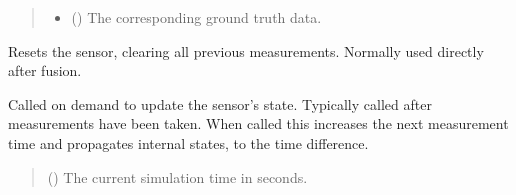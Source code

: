 \documentclass[letterpaper,10pt,english]{sphinxmanual}
\begin{document}
\begin{fulllineitems}
\begin{fulllineitems}
\begin{quote}
\begin{description}
\begin{itemize}
\item {} 
\sphinxAtStartPar
{} ({\hyperref[\detokenize{modules/waypoints/trajectory:qnav.waypoints.trajectory.GroundTruth}]{}}) \textendash{} The corresponding ground truth data.

\end{itemize}

\end{description}\end{quote}

\end{fulllineitems}


\begin{fulllineitems}
\label{\detokenize{modules/quantum/gravity_gradient:qnav.quantum.gravity_gradient.GravityGradiometer.reset}}
\pysigstartsignatures
{}
\pysigstopsignatures
\sphinxAtStartPar
Resets the sensor, clearing all previous measurements.
Normally used directly after fusion.

\end{fulllineitems}


\begin{fulllineitems}
\label{\detokenize{modules/quantum/gravity_gradient:qnav.quantum.gravity_gradient.GravityGradiometer.update}}
\pysigstartsignatures
{}
\pysigstopsignatures
\sphinxAtStartPar
Called on demand to update the sensor’s state.
Typically called after measurements have been taken. When called
this increases the next measurement time and propagates internal
states, to the time difference.
\begin{quote}\begin{description}
\sphinxAtStartPar
{} () \textendash{} The current simulation time in seconds.


\end{description}
\end{quote}
\end{fulllineitems}
\end{fulllineitems}
\end{document}
